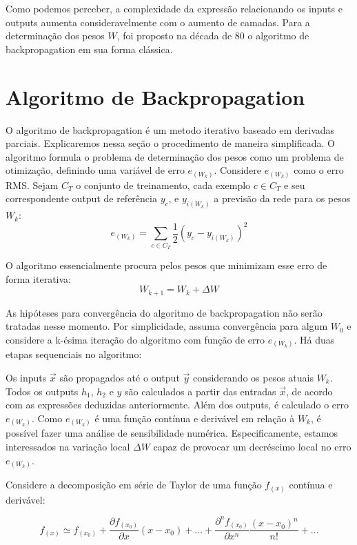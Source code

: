 \documentclass[
	12pt,				%
	oneside,			%
	a4paper,			%
	english,			%
	french,				%
	spanish,			%
	brazil,				%
	]{abntex2}
\begin{document}
Como podemos perceber, a complexidade da express\~ao relacionando os inputs e outputs aumenta consideravelmente com o aumento de camadas. Para a determina\c{c}\~ao dos pesos $W$, foi proposto na década de 80 o algoritmo de backpropagation em sua forma clássica.

\section{Algoritmo de Backpropagation}

O algoritmo de backpropagation \'e um metodo iterativo baseado em derivadas parciais. Explicaremos nessa se\c{c}\~ao o procedimento de maneira simplificada. O algoritmo formula o problema de determina\c{c}\~ao dos pesos como um problema de otimiza\c{c}\~ao, definindo uma vari\'avel de erro $e_{(W_k)}$. Considere $e_{(W_k)}$ como o erro RMS. Sejam $C_T$ o conjunto de treinamento, cada exemplo $c \in C_T$ e seu correspondente output de referência $y_c$, e $y_{i(W_k)}$ a previsão da rede para os pesos $W_k$:
$$e_{(W_k)} = \sum_{c \in C_T} \frac{1}{2} (y_{c} - y_{i(W_k)})^2$$

O algoritmo essencialmente procura pelos pesos que minimizam esse erro de forma iterativa:
$$W_{k+1} = W_k + \Delta W$$

As hip\'oteses para converg\^encia do algoritmo de backpropagation n\~ao ser\~ao tratadas nesse momento. Por simplicidade, assuma converg\^encia para algum $W_0$ e considere a k-\'esima itera\c{c}\~ao do algoritmo com fun\c{c}\~ao de erro $e_{(W_k)}$. H\'a duas etapas sequenciais no algoritmo:

Os inputs $\vec{x}$ s\~ao propagados at\'e o output $\vec{y}$ considerando os pesos atuais $W_k$. Todos os outputs $h_1$, $h_2$ e $y$ s\~ao calculados a partir das entradas $\vec{x}$, de acordo com as express\~oes deduzidas anteriormente. Al\'em dos outputs, \'e calculado o erro $e_{(W_k)}$.  Como $e_{(W_k)}$ \'e uma fun\c{c}\~ao cont\'inua e deriv\'avel em rela\c{c}\~ao \`a $W_k$, \'e poss\'ivel fazer uma an\'alise de sensibilidade num\'erica. Especificamente, estamos interessados na varia\c{c}\~ao local $\Delta W$ capaz de provocar um decr\'escimo local no erro $e_{(W_k)}$.


Considere a decomposi\c{c}\~ao em s\'erie de Taylor de uma fun\c{c}\~ao $f_{(x)}$ cont\'inua e deriv\'avel:

$$f_{(x)} \simeq f_{(x_0)} + \frac{ \partial f_{(x_0)} } {\partial x} (x - x_0) + ... +
\frac{ \partial^n f_{(x_0)} } {\partial x^n} \frac{ (x - x_0)^n } { n! } + ...$$
\end{document}
